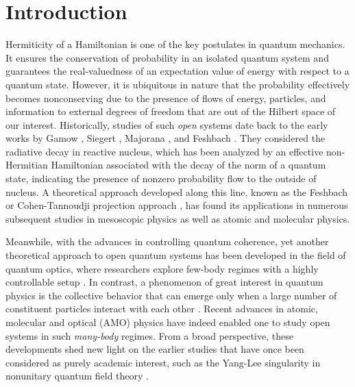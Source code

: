 \documentclass{tADP2e}
\theoremstyle{plain}
\theoremstyle{plain}
\theoremstyle{definition}
\begin{document}
\begin{abstract}
{{\hspace*{8pt} {6.3. Miscellaneous topics on non-Hermitian topological systems}\\%
{7. Summary and outlook}\\%
\\
{Appendix A. Details on the Jordan normal form and the proofs}\\%
{Appendix B. General description of quadratic Hamiltonians}\\%
{Appendix C. Bound on correlations in matrix-product states}\\%
{Appendix D. Continuous Hermitianization of line-gapped Bloch Hamiltonians}\\%
{Appendix E. Topological classifications of the Bernard-LeClair classes}\\%
}}
\end{abstract}


\newpage
\section{Introduction\label{sec1}}

Hermiticity of a Hamiltonian is one of the key postulates in quantum mechanics. It ensures the conservation of probability in an isolated quantum system and guarantees the real-valuedness of an expectation value of energy with respect to a quantum state. However, it is ubiquitous in nature that the probability effectively becomes nonconserving due to the presence of flows of energy, particles, and information to external degrees of freedom that are out of the Hilbert space of our interest. Historically, studies of such {\it open} systems date back to the early works by Gamow \cite{GG28}, Siegert \cite{SAJ39},  Majorana \cite{ME06}, and Feshbach \cite{HF58,HF62}. They considered the radiative decay in reactive nucleus, which has been analyzed by an effective non-Hermitian Hamiltonian associated with the decay of the norm of a quantum state, indicating the presence of nonzero probability flow to the outside of nucleus. A theoretical approach developed along this line, known as the Feshbach or Cohen-Tannoudji projection approach \cite{HF58,HF62,CCT68}, has found its applications in numerous subsequent studies in mesoscopic physics as well as atomic and molecular physics. 

Meanwhile, with the advances in controlling quantum coherence, yet another theoretical approach to open quantum systems has been developed in the field of quantum optics, where researchers explore few-body regimes with a highly controllable setup \cite{CCT98}. In contrast, a phenomenon of great interest in quantum physics is the collective behavior that can emerge only when a large number of constituent particles interact with each other \cite{APW72}. Recent advances in atomic, molecular and optical (AMO) physics have indeed enabled one to study open systems in such {\it many-body} regimes. From a broad perspective, these developments shed new light on the earlier studies that have once been considered as purely academic interest, such as the Yang-Lee  singularity \cite{LTD52} in nonunitary quantum field theory \cite{MEF78}.
\end{document}
